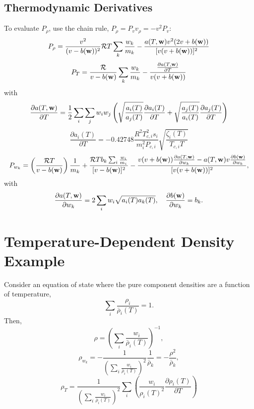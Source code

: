 \documentclass[final]{siamltex}
\def\wb {{\bf w}}
\def\half   {\frac{1}{2}}
\begin{document}
\subsection{Thermodynamic Derivatives}
To evaluate $P_\rho$, use the chain rule, $P_\rho = P_v v_\rho = -v^2 P_v$:
\begin{equation}
P_\rho = \frac{v^2}{(v-b(\wb))^2}\mathcal{R}T\sum_k\frac{w_k}{m_k} - \frac{a(T,\wb)v^2(2v+b(\wb))}{[v(v+b(\wb))]^2}
\end{equation}
\begin{equation}
P_T = \frac{\mathcal{R}}{v-b(\wb)}\sum_k\frac{w_k}{m_k} - \frac{\frac{\partial a(T,\wb)}{\partial T}}{v(v+b(\wb))}
\end{equation}
with
\begin{equation}
\frac{\partial a(T,\wb)}{\partial T} = \half \sum_i\sum_j w_i w_j\left(\sqrt{\frac{a_i(T)}{a_j(T)}}\frac{\partial a_i(T)}{\partial T} + \sqrt{\frac{a_j(T)}{a_i(T)}}\frac{\partial a_j(T)}{\partial T}\right)
\end{equation}
\begin{equation}
\frac{\partial a_i(T)}{\partial T} = -0.42748\frac{R^2T_{c,i}^2s_i}{m_i^2 P_{c,i}}\sqrt{\frac{\zeta_i(T)}{T_{c,i}T}}
\end{equation}
\begin{equation}
P_{w_k} = \left(\frac{\mathcal{R}T}{v-b(\wb)}\right)\frac{1}{m_k}
+\frac{\mathcal{R}Tb_k\sum_i\frac{w_i}{m_i}}{[v-b(\wb)]^2}
- \frac{v(v+b(\wb))\frac{\partial a(T,\wb)}{\partial w_k} - a(T,\wb)v\frac{\partial b(\wb)}{\partial w_k}}{[v(v+b(\wb))]^2},
\end{equation}
with
\begin{equation}
\frac{\partial a(T,\wb)}{\partial w_k} = 2\sum_i w_i\sqrt{a_i(T)a_k(T)},
\quad
\frac{\partial b(\wb)}{\partial w_k} = b_k.
\end{equation}

\section{Temperature-Dependent Density Example}
Consider an equation of state where the pure component densities are a function
of temperature,
\begin{equation}
\sum_i\frac{\rho_i}{\bar\rho_i(T)} = 1.
\end{equation}
Then,
\begin{equation}
\rho = \left(\sum_i\frac{w_i}{\bar\rho_i(T)}\right)^{-1},
\end{equation}
\begin{equation}
\rho_{w_k} = -\frac{1}{\left(\sum_i\frac{w_i}{\bar\rho_i(T)}\right)^2}\frac{1}{\bar\rho_k}
= -\frac{\rho^2}{\bar\rho_k},
\end{equation}
\begin{equation}
\rho_T = \frac{1}{\left(\sum_i\frac{w_i}{\bar\rho_i(T)}\right)^2}\sum_i\left(\frac{w_i}{\rho_i(T)^2}\frac{\partial\rho_i(T)}{\partial T}\right)
\end{equation}
\end{document}

